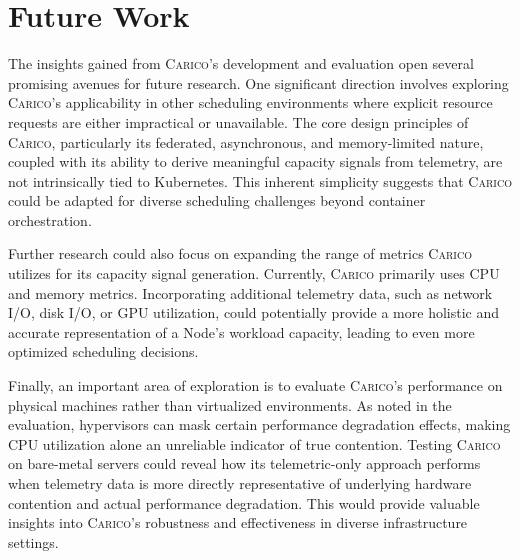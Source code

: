 
\section{Future Work}
The insights gained from \textsc{Carico}'s development and evaluation open several
promising avenues for future research. One significant direction involves
exploring \textsc{Carico}'s applicability in other scheduling environments where explicit
resource requests are either impractical or unavailable. The core design
principles of \textsc{Carico}, particularly its federated, asynchronous, and
memory-limited nature, coupled with its ability to derive meaningful capacity
signals from telemetry, are not intrinsically tied to Kubernetes. This inherent
simplicity suggests that \textsc{Carico} could be adapted for diverse scheduling
challenges beyond container orchestration.

Further research could also focus on expanding the range of metrics \textsc{Carico}
utilizes for its capacity signal generation. Currently, \textsc{Carico} primarily uses
CPU and memory metrics. Incorporating additional telemetry data, such as network
I/O, disk I/O, or GPU utilization, could potentially provide a more holistic and
accurate representation of a Node's workload capacity, leading to even more
optimized scheduling decisions.

Finally, an important area of exploration is to evaluate \textsc{Carico}'s performance on
physical machines rather than virtualized environments. As noted in the
evaluation, hypervisors can mask certain performance degradation effects, making
CPU utilization alone an unreliable indicator of true contention. Testing \textsc{Carico}
on bare-metal servers could reveal how its telemetric-only approach performs
when telemetry data is more directly representative of underlying hardware
contention and actual performance degradation. This would provide valuable
insights into \textsc{Carico}'s robustness and effectiveness in diverse infrastructure
settings.

